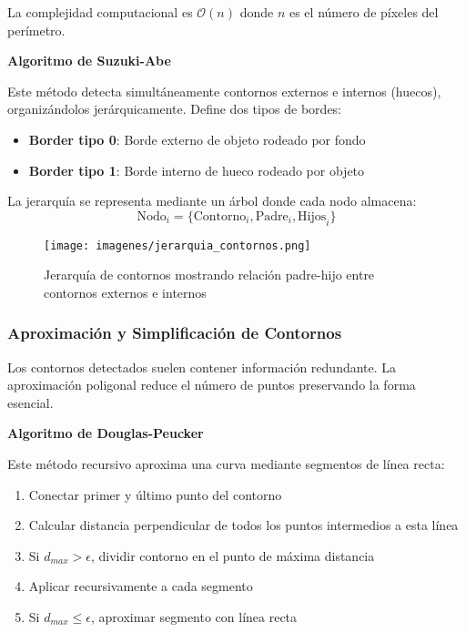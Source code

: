 La complejidad computacional es $\mathcal{O}(n)$ donde $n$ es el número de píxeles del perímetro.

\textbf{Algoritmo de Suzuki-Abe}

Este método detecta simultáneamente contornos externos e internos (huecos), organizándolos jerárquicamente. Define dos tipos de bordes:

\begin{itemize}
\item \textbf{Border tipo 0}: Borde externo de objeto rodeado por fondo
\item \textbf{Border tipo 1}: Borde interno de hueco rodeado por objeto
\end{itemize}

La jerarquía se representa mediante un árbol donde cada nodo almacena:
\begin{equation}
\text{Nodo}_i = \{\text{Contorno}_i, \text{Padre}_i, \text{Hijos}_i\}
\end{equation}

\begin{figure}[h]
\centering
\texttt{[image: imagenes/jerarquia\_contornos.png]}
\caption{Jerarquía de contornos mostrando relación padre-hijo entre contornos externos e internos}
\label{fig:jerarquia_contornos}
\end{figure}

\subsubsection{Aproximación y Simplificación de Contornos}

Los contornos detectados suelen contener información redundante. La aproximación poligonal reduce el número de puntos preservando la forma esencial.

\textbf{Algoritmo de Douglas-Peucker}

Este método recursivo aproxima una curva mediante segmentos de línea recta:

\begin{enumerate}
\item Conectar primer y último punto del contorno
\item Calcular distancia perpendicular de todos los puntos intermedios a esta línea
\item Si $d_{max} > \epsilon$, dividir contorno en el punto de máxima distancia
\item Aplicar recursivamente a cada segmento
\item Si $d_{max} \leq \epsilon$, aproximar segmento con línea recta
\end{enumerate}

